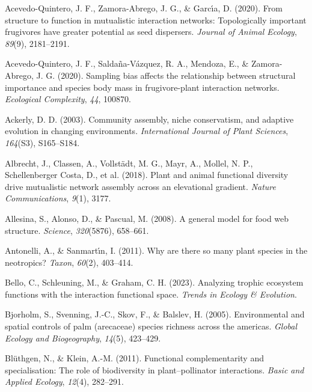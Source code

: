 \documentclass[
]{agujournal2019}
\newlength{\cslhangindent}
\newenvironment{CSLReferences}[2] %
 {\begin{list}{}{%
  \setlength{\itemindent}{0pt}
  \setlength{\leftmargin}{0pt}
  \setlength{\parsep}{0pt}
  \ifodd #1
   \setlength{\leftmargin}{\cslhangindent}
   \setlength{\itemindent}{-1\cslhangindent}
  \fi
  \setlength{\itemsep}{#2\baselineskip}}}
 {\end{list}}
\begin{document}
\label{refs}
\begin{CSLReferences}{1}{0}
Acevedo-Quintero, J. F., Zamora-Abrego, J. G., \& Garcı́a, D. (2020).
From structure to function in mutualistic interaction networks:
Topologically important frugivores have greater potential as seed
dispersers. \emph{Journal of Animal Ecology}, \emph{89}(9), 2181--2191.

Acevedo-Quintero, J. F., Saldaña-Vázquez, R. A., Mendoza, E., \&
Zamora-Abrego, J. G. (2020). Sampling bias affects the relationship
between structural importance and species body mass in frugivore-plant
interaction networks. \emph{Ecological Complexity}, \emph{44}, 100870.

Ackerly, D. D. (2003). Community assembly, niche conservatism, and
adaptive evolution in changing environments. \emph{International Journal
of Plant Sciences}, \emph{164}(S3), S165--S184.

Albrecht, J., Classen, A., Vollstädt, M. G., Mayr, A., Mollel, N. P.,
Schellenberger Costa, D., et al. (2018). Plant and animal functional
diversity drive mutualistic network assembly across an elevational
gradient. \emph{Nature Communications}, \emph{9}(1), 3177.

Allesina, S., Alonso, D., \& Pascual, M. (2008). A general model for
food web structure. \emph{Science}, \emph{320}(5876), 658--661.

Antonelli, A., \& Sanmartı́n, I. (2011). Why are there so many plant
species in the neotropics? \emph{Taxon}, \emph{60}(2), 403--414.

Bello, C., Schleuning, M., \& Graham, C. H. (2023). Analyzing trophic
ecosystem functions with the interaction functional space. \emph{Trends
in Ecology \& Evolution}.

Bjorholm, S., Svenning, J.-C., Skov, F., \& Balslev, H. (2005).
Environmental and spatial controls of palm (arecaceae) species richness
across the americas. \emph{Global Ecology and Biogeography},
\emph{14}(5), 423--429.

Blüthgen, N., \& Klein, A.-M. (2011). Functional complementarity and
specialisation: The role of biodiversity in plant--pollinator
interactions. \emph{Basic and Applied Ecology}, \emph{12}(4), 282--291.


\end{CSLReferences}
\end{document}
